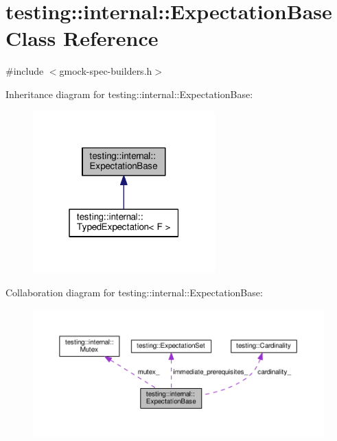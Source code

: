 \hypertarget{classtesting_1_1internal_1_1ExpectationBase}{}\section{testing\+:\+:internal\+:\+:Expectation\+Base Class Reference}
\label{classtesting_1_1internal_1_1ExpectationBase}


{\ttfamily \#include $<$gmock-\/spec-\/builders.\+h$>$}



Inheritance diagram for testing\+:\+:internal\+:\+:Expectation\+Base\+:\nopagebreak
\begin{figure}[H]
\begin{center}
\leavevmode
\includegraphics[width=199pt]{classtesting_1_1internal_1_1ExpectationBase__inherit__graph}
\end{center}
\end{figure}


Collaboration diagram for testing\+:\+:internal\+:\+:Expectation\+Base\+:\nopagebreak
\begin{figure}[H]
\begin{center}
\leavevmode
\includegraphics[width=350pt]{classtesting_1_1internal_1_1ExpectationBase__coll__graph}
\end{center}
\end{figure}
